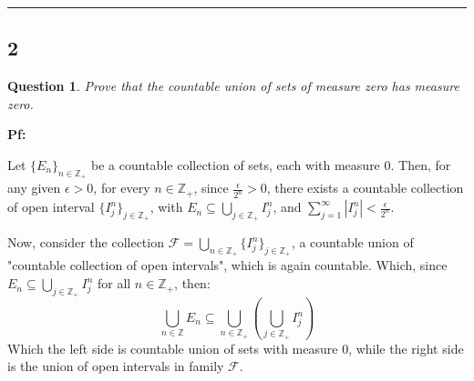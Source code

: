 \documentclass{article}
\newtheorem{question}{Question}
\begin{document}
\hfill

\rule{15.5cm}{0.1mm}

\hfill

\subsection*{2}
\begin{myBox2}[]{}
    \begin{question}
        Prove that the countable union of sets of measure zero has measure zero.
    \end{question}
\end{myBox2}

\textbf{Pf:}

Let $\{E_n\}_{n\in\mathbb{Z}_+}$ be a countable collection of sets, each with measure $0$. Then, for any given $\epsilon>0$, for every $n\in\mathbb{Z}_+$, since $\frac{\epsilon}{2^n}>0$,
there exists a countable collection of open interval $\{I_j^n\}_{j\in\mathbb{Z}_+}$, with $E_n \subseteq \bigcup_{j\in\mathbb{Z}_+}I_j^n$, and $\sum_{j=1}^{\infty}|I_j^n|<\frac{\epsilon}{2^n}$.

Now, consider the collection $\mathcal{F}=\bigcup_{n\in\mathbb{Z}_+}\{I_j^n\}_{j\in\mathbb{Z}_+}$, a countable union of "countable collection of open intervals", which is again countable.
Which, since $E_n \subseteq \bigcup_{j\in\mathbb{Z}_+}I_j^n$ for all $n\in\mathbb{Z}_+$, then:
$$\bigcup_{n\in\mathbb{Z}}E_n \subseteq \bigcup_{n\in\mathbb{Z}_+}\left(\bigcup_{j\in\mathbb{Z}_+}I_j^n\right)$$
Which the left side is countable union of sets with measure $0$, while the right side is the union of open intervals in family $\mathcal{F}$.
\end{document}
